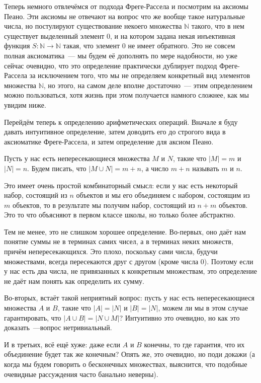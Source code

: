 Теперь немного отвлечёмся от подхода Фреге-Рассела и посмотрим на аксиомы Пеано. Эти аксиомы не отвечают на вопрос что же вообще такое натуральные числа, но постулируют существование некоего множества $\mathbb{N}$ такого, что в нем существует выделенный элемент 0, и на котором задана некая инъективная функция $S:\mathbb{N}\to\mathbb{N}$ такая, что элемент 0 не имеет обратного. Это не совсем полная аксиоматика~--- мы будем её дополнять по мере надобности, но уже сейчас очевидно, что это определение практически дублирует подход Фреге-Рассела за исключением того, что мы не определяем конкретный вид элементов множества $\mathbb{N}$, но этого, на самом деле вполне достаточно~--- этим определением можно пользоваться, хотя жизнь при этом получается намного сложнее, как мы увидим ниже.

Перейдём теперь к определению арифметических операций. Вначале я буду давать интуитивное определение, затем доводить его до строгого вида в аксиоматике Фреге-Рассела, и затем определение для аксиом Пеано.

\begin{definition}
Пусть у нас есть непересекающиеся множества $M$ и $N$, такие что $|M|=m$ и $|N| = n$. Будем писать, что $|M\cup N| = m+n$, а число $m+n$ называть  $m$ и $n$.
\end{definition}

Это имеет очень простой комбинаторный смысл: если у нас есть некоторый набор, состоящий из $n$ объектов и мы его объединяем с набором, состоящим из $m$ объектов, то в результате мы получим набор, состоящий из $n+m$ объектов. Это то что объясняют в первом классе школы, но только более абстрактно.

Тем не менее, это не слишком хорошее определение. Во-первых, оно даёт нам понятие суммы не в терминах самих чисел, а в терминах неких множеств, причём непересекающихся. Это плохо, поскольку сами числа, будучи множествами, всегда пересекаются друг с другом (кроме числа 0). Поэтому если у нас есть два числа, не привязанных к конкретным множествам, это определение не даёт нам понять как определить их сумму.

Во-вторых, встаёт такой неприятный вопрос: пусть у нас есть непересекающиеся множества $A$ и $B$, такие что $|A|=|N|$ и $|B|=|N|$, можем ли мы в этом случае гарантировать, что $|A\cup B| = |N\cup M|$? Интуитивно это очевидно, но как это доказать~---вопрос нетривиальный.

И в третьих, всё ещё хуже: даже если $A$ и $B$ конечны, то где гарантия, что их объединение будет так же конечным? Опять же, это очевидно, но поди докажи (а когда мы будем говорить о бесконечных множествах, выяснится, что подобные очевидные рассуждения часто банально неверны).

